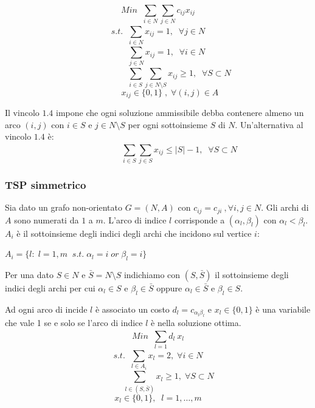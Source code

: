 \begin{equation}
	Min\;\;\sum_{i\in N}^{} \sum_{j\in N}^{} c_{ij} x_{ij}
\end{equation}
\begin{equation}
	s.t.\;\;\sum_{i\in N}^{} x_{ij} = 1,\;\;\forall j \in N
\end{equation}
\begin{equation}
	\;\;\;\;\;\;\;\sum_{j\in N}^{} x_{ij} = 1,\;\;\forall i \in N
\end{equation}
\begin{equation}
	\;\;\;\;\;\;\;\;\;\;\;\;\;\;\;\;\;\;\sum_{i\in S}^{} \sum_{j\in N\setminus S}^{} x_{ij} \ge 1,\;\;\forall S \subset N
\end{equation}
\begin{equation}
	\;\;\;\;\;\;\;\;\;\;x_{ij} \in \{0,1\}\;,\;\forall (i,j) \in A
\end{equation}

Il vincolo $1.4$ impone che ogni soluzione ammissibile debba contenere almeno un arco $(i,j)$ con $i\in S$ e $j\in N\setminus S$ per ogni sottoinsieme $S$ di $N$.
Un'alternativa al vincolo $1.4$ è:
\begin{equation}\tag{1.4'}
\;\;\;\;\;\;\;\;\;\;\;\;\;\;\;\;\;\;\sum_{i\in S}^{} \sum_{j\in S}^{} x_{ij} \le |S| - 1,\;\;\forall S \subset N
\end{equation}

\subsubsection{TSP simmetrico}
Sia dato un grafo non-orientato $G=(N,A)$ con $c_{ij} = c_{ji}\:,\forall i,j\in N$.\newline
Gli archi di $A$ sono numerati da $1$ a $m$. L'arco di indice $l$ corrisponde a $(\alpha_{l},\beta_{l})$ con $\alpha_{l} < \beta_{l}$.\newline
$A_{i}$ è il sottoinsieme degli indici degli archi che incidono sul vertice $i$:
\begin{center}
	$A_{i} = \{l:\;l=1,m\;\;s.t.\;\alpha_{l}=i\;or\;\beta_{l}=i\}$
\end{center}

Per una dato $S\in N$ e $\bar{S} = N\setminus S$ indichiamo con $(S, \bar{S})$ il sottoinsieme degli indici degli archi per cui $\alpha_{l}\in S$ e $\beta_{l}\in \bar{S}$ oppure $\alpha_{l}\in \bar{S}$ e $\beta_{l}\in S$.

Ad ogni arco di incide $l$ è associato un costo $d_{l}=c_{\alpha_{l}\beta_{l}}$ e $x_{l}\in \{0,1\}$ è una variabile che vale 1 se e solo se l'arco di indice $l$ è nella soluzione ottima.
\begin{equation}
	Min\;\;\sum_{l=1}^{} d_{l}\:x_{l}
\end{equation}
\begin{equation}
	s.t.\;\;\sum_{l\in A_{i}}^{} x_{l}=2,\; \forall i\in N
\end{equation}
\begin{equation}
	\;\;\;\;\;\;\;\;\;\sum_{l\in (S, \bar{S})}^{} x_{l} \ge 1,\;\forall S \subset N
\end{equation}
\begin{equation}
	x_{l}\in \{0,1\},\;\;l=1,\dots,m
\end{equation}

